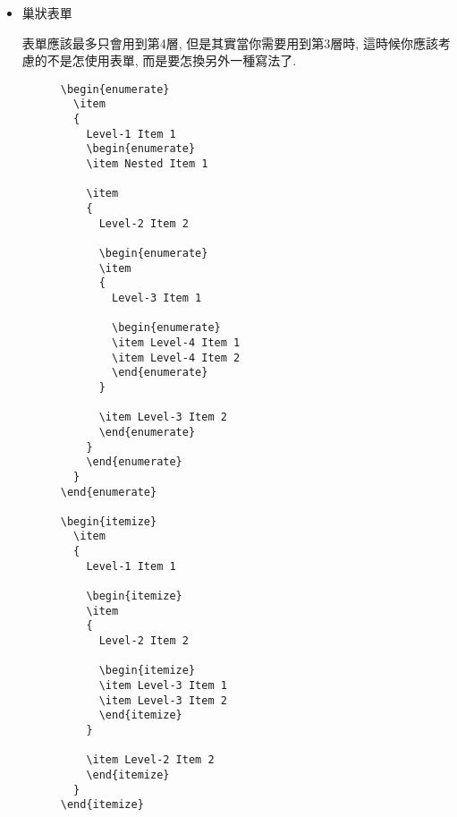 \begin{itemize}
  \newpage
  \item
  {
    巢狀表單

    表單應該最多只會用到第4層, 但是其實當你需要用到第3層時, 這時候你應該考慮的不是怎使用表單, 而是要怎換另外一種寫法了.

    \begin{framed}
    \begin{verbatim}
      \begin{enumerate}
        \item
        {
          Level-1 Item 1
          \begin{enumerate}
          \item Nested Item 1

          \item
          {
            Level-2 Item 2

            \begin{enumerate}
            \item
            {
              Level-3 Item 1

              \begin{enumerate}
              \item Level-4 Item 1
              \item Level-4 Item 2
              \end{enumerate}
            }

            \item Level-3 Item 2
            \end{enumerate}
          }
          \end{enumerate}
        }
      \end{enumerate}

      \begin{itemize}
        \item
        {
          Level-1 Item 1

          \begin{itemize}
          \item
          {
            Level-2 Item 2

            \begin{itemize}
            \item Level-3 Item 1
            \item Level-3 Item 2
            \end{itemize}
          }

          \item Level-2 Item 2
          \end{itemize}
        }
      \end{itemize}
    \end{verbatim}
    \end{framed}

}
\end{itemize}
